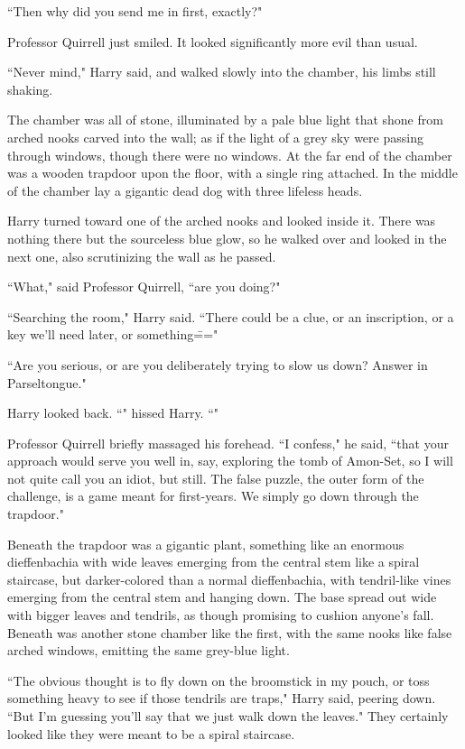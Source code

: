 ``Then why did you send me in first, exactly?"

Professor Quirrell just smiled. It looked significantly more evil than usual.

``Never mind," Harry said, and walked slowly into the chamber, his limbs still shaking.

The chamber was all of stone, illuminated by a pale blue light that shone from arched nooks carved into the wall; as if the light of a grey sky were passing through windows, though there were no windows. At the far end of the chamber was a wooden trapdoor upon the floor, with a single ring attached. In the middle of the chamber lay a gigantic dead dog with three lifeless heads.

Harry turned toward one of the arched nooks and looked inside it. There was nothing there but the sourceless blue glow, so he walked over and looked in the next one, also scrutinizing the wall as he passed.

``What," said Professor Quirrell, ``are you doing?"

``Searching the room," Harry said. ``There could be a clue, or an inscription, or a key we'll need later, or something\==="

``Are you serious, or are you deliberately trying to slow us down? Answer in Parseltongue."

Harry looked back. ``" hissed Harry. ``"

Professor Quirrell briefly massaged his forehead. ``I confess," he said, ``that your approach would serve you well in, say, exploring the tomb of Amon-Set, so I will not quite call you an idiot, but still. The false puzzle, the outer form of the challenge, is a game meant for first-years. We simply go down through the trapdoor."

Beneath the trapdoor was a gigantic plant, something like an enormous dieffenbachia with wide leaves emerging from the central stem like a spiral staircase, but darker-colored than a normal dieffenbachia, with tendril-like vines emerging from the central stem and hanging down. The base spread out wide with bigger leaves and tendrils, as though promising to cushion anyone's fall. Beneath was another stone chamber like the first, with the same nooks like false arched windows, emitting the same grey-blue light.

``The obvious thought is to fly down on the broomstick in my pouch, or toss something heavy to see if those tendrils are traps," Harry said, peering down. ``But I'm guessing you'll say that we just walk down the leaves." They certainly looked like they were meant to be a spiral staircase.

